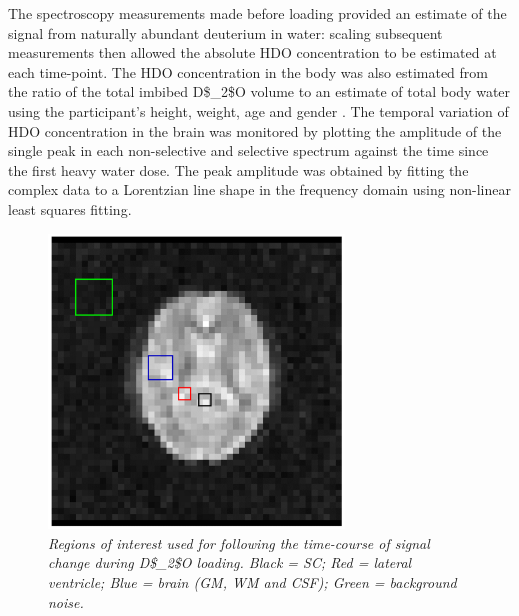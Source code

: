 The spectroscopy measurements made before loading provided an estimate of the signal from naturally abundant deuterium in water: scaling subsequent measurements then allowed the absolute \ac{HDO} concentration to be estimated at each time-point. The \ac{HDO} concentration in the body was also estimated from the ratio of the total imbibed \ac{D$_2$O} volume to an estimate of total body water using the participant’s height, weight, age and gender \cite{Watson1980TotalMeasurements}. The temporal variation of \ac{HDO} concentration in the brain was monitored by plotting the amplitude of the single peak in each non-selective and selective spectrum against the time since the first heavy water dose. The peak amplitude was obtained by fitting the complex data to a Lorentzian line shape in the frequency domain using non-linear least squares fitting. 

\begin{figure}[H]
    \centering
    \includegraphics[width=0.7\textwidth]{Figures/D2O/ROI.png}
    \caption{\textit{Regions of interest used for following the time-course of signal change during \ac{D$_2$O} loading. Black = \ac{SC}; Red = lateral ventricle; Blue = brain (\ac{GM}, \ac{WM} and \ac{CSF}); Green = background noise.}}
    \label{fig:D2O:ROI}
\end{figure}

